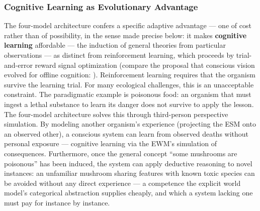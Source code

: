 \documentclass[12pt]{article}
\begin{document}
\subsubsection{Cognitive Learning as Evolutionary Advantage}


The four-model architecture confers a specific adaptive advantage --- one of cost rather than of possibility, in the sense made precise below: it makes \textbf{cognitive learning} affordable --- the induction of general theories from particular observations --- as distinct from reinforcement learning, which proceeds by trial-and-error reward signal optimization (compare the proposal that conscious vision evolved for offline cognition: \citealp{FlemingMichel2025,FlemingMichel2026}). Reinforcement learning requires that the organism survive the learning trial. For many ecological challenges, this is an unacceptable constraint. The paradigmatic example is poisonous food: an organism that must ingest a lethal substance to learn its danger does not survive to apply the lesson. The four-model architecture solves this through third-person perspective simulation. By modeling another organism's experience (projecting the ESM onto an observed other), a conscious system can learn from observed deaths without personal exposure --- cognitive learning via the EWM's simulation of consequences. Furthermore, once the general concept ``some mushrooms are poisonous'' has been induced, the system can apply deductive reasoning to novel instances: an unfamiliar mushroom sharing features with known toxic species can be avoided without any direct experience --- a competence the explicit world model's categorical abstraction supplies cheaply, and which a system lacking one must pay for instance by instance.
\end{document}
